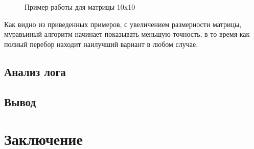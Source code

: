\documentclass[a4paper,12pt]{report}
\begin{document}
\begin{figure}[ht!]
\caption{Пример работы для матрицы 10x10}
\end{figure}

Как видно из приведенных примеров, с увеличением размерности матрицы, муравьиный алгоритм начинает показывать меньшую точность, в то время как полный перебор находит наилучший вариант в любом случае. 

\section{Анализ лога}

\hspace{0.6cm}

\section{Вывод}
\hspace{0.6cm} 

\newpage
\chapter*{Заключение}
\hspace{0.6cm}
  
\end{document}
